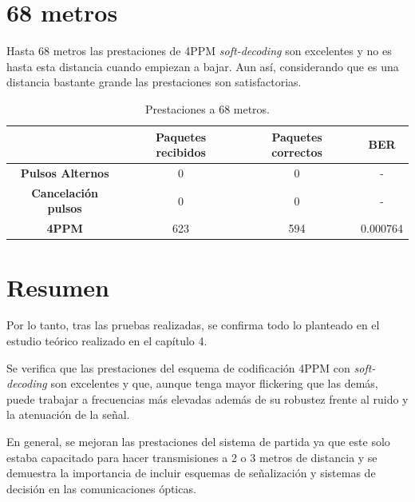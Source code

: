 \section{68 metros}

Hasta 68 metros las prestaciones de 4PPM \textit{soft-decoding} son excelentes y no 
es hasta esta distancia cuando empiezan a bajar. Aun así, considerando que es una 
distancia bastante grande las prestaciones son satisfactorias.

\begin{table}[ht]
	\begin{tabular}{c|c|c|c|}
	\cline{2-4}
														 & \textbf{Paquetes recibidos} & \textbf{Paquetes correctos} & \textbf{BER} \\ \hline
	\multicolumn{1}{|c|}{\textbf{Pulsos Alternos}}       & 0                           & 0                           & -            \\ \hline
	\multicolumn{1}{|c|}{\textbf{Cancelación pulsos}} 	 & 0                           & 0                           & -            \\ \hline
	\multicolumn{1}{|c|}{\textbf{4PPM}}                  & 623                         & 594                         & 0.000764     \\ \hline
	\end{tabular}
	\caption{\small{Prestaciones a 68 metros.}}
	\end{table}

\section{Resumen}
Por lo tanto, tras las pruebas realizadas, se confirma todo lo planteado en el estudio
teórico realizado en el capítulo 4. 

Se verifica que las prestaciones del esquema de codificación 4PPM con 
\textit{soft-decoding} son excelentes y que, aunque tenga mayor flickering que las 
demás, puede trabajar a frecuencias más elevadas además de su robustez frente al ruido 
y la atenuación de la señal.

En general, se mejoran las prestaciones del sistema de partida ya que este solo estaba
capacitado para hacer transmisiones a 2 o 3 metros de distancia y se demuestra la 
importancia de incluir esquemas de señalización y sistemas de decisión en las 
comunicaciones ópticas.

\chapterend{}